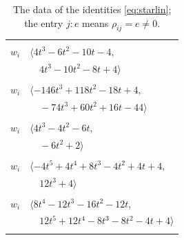 \documentclass[11pt]{article}
\begin{document}
\begingroup\scriptsize
\setlength{\LTcapwidth}{\textwidth}
\begin{longtable}{@{}ll@{}}
\caption{The data of the identities \eqref{eq:starlin}; the entry $j{:}e$ means $\rho_{ij}=e\neq0$.}\label{tab:star}\\
\hline\endfirsthead\hline\endhead\hline\endfoot
\multicolumn{2}{@{}p{0.97\textwidth}@{}}{$i=0$, $D_i=4$, $\rho_{ij}$: $8{:}1, \allowbreak 10{:}2, \allowbreak 14{:}2, \allowbreak 16{:}1, \allowbreak 19{:}1, \allowbreak 21{:}1, \allowbreak 23{:}2$}\\
$w_i$ & $\langle 4t^{3}-6t^{2}-10t-4,$\\
 & $\quad 4t^{3}-10t^{2}-8t+4\rangle$\\
\addlinespace[2pt]
\multicolumn{2}{@{}p{0.97\textwidth}@{}}{$i=1$, $D_i=4$, $\rho_{ij}$: $10{:}1, \allowbreak 12{:}2, \allowbreak 14{:}1, \allowbreak 15{:}1, \allowbreak 18{:}2, \allowbreak 21{:}2, \allowbreak 27{:}2, \allowbreak 29{:}2, \allowbreak 41{:}1$}\\
$w_i$ & $\langle -146t^{3}+118t^{2}-18t+4,$\\
 & $\quad -74t^{3}+60t^{2}+16t-44\rangle$\\
\addlinespace[2pt]
\multicolumn{2}{@{}p{0.97\textwidth}@{}}{$i=2$, $D_i=2$, $\rho_{ij}$: $5{:}1, \allowbreak 9{:}2, \allowbreak 17{:}2, \allowbreak 20{:}1, \allowbreak 28{:}1, \allowbreak 37{:}1$}\\
$w_i$ & $\langle 4t^{3}-4t^{2}-6t,$\\
 & $\quad -6t^{2}+2\rangle$\\
\addlinespace[2pt]
\multicolumn{2}{@{}p{0.97\textwidth}@{}}{$i=3$, $D_i=4$, $\rho_{ij}$: $8{:}1, \allowbreak 11{:}1, \allowbreak 17{:}2, \allowbreak 28{:}2, \allowbreak 29{:}2, \allowbreak 37{:}1$}\\
$w_i$ & $\langle -4t^{5}+4t^{4}+8t^{3}-4t^{2}+4t+4,$\\
 & $\quad 12t^{3}+4\rangle$\\
\addlinespace[2pt]
\multicolumn{2}{@{}p{0.97\textwidth}@{}}{$i=4$, $D_i=4$, $\rho_{ij}$: $7{:}2, \allowbreak 20{:}1, \allowbreak 24{:}1, \allowbreak 25{:}1, \allowbreak 28{:}1, \allowbreak 30{:}2, \allowbreak 38{:}1, \allowbreak 41{:}2$}\\
$w_i$ & $\langle 8t^{4}-12t^{3}-16t^{2}-12t,$\\
 & $\quad 12t^{5}+12t^{4}-8t^{3}-8t^{2}-4t+4\rangle$\\
\addlinespace[2pt]
\multicolumn{2}{@{}p{0.97\textwidth}@{}}{$i=5$, $D_i=32$, $\rho_{ij}$: $2{:}2, \allowbreak 10{:}2, \allowbreak 20{:}1, \allowbreak 27{:}1, \allowbreak 28{:}2, \allowbreak 33{:}1$}\\

\end{longtable}
\end{document}
